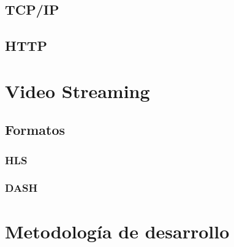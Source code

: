 \subsection{TCP/IP}

\subsection{HTTP}

\section{Video Streaming}

\subsection{Formatos}

\subsubsection{HLS}

\subsubsection{DASH}

\section{Metodología de desarrollo}
